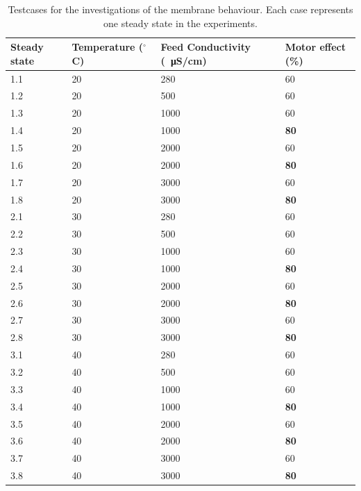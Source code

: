 \begin{table}[H]
\centering
\begin{tabular}{|p{1.4cm}||p{2cm}|p{3.2cm}|p{1.8cm}|}
 \hline
 \textbf{Steady state }&Temperature  ($^{\circ}$C)&Feed Conductivity (\SI{}{\micro\siemens}/cm)&Motor effect (\%) \\
 \hline
 1.1 & 20 & 280  & 60 \\
 1.2 & 20 & 500  & 60 \\
 1.3 & 20 & 1000 & 60  \\
 1.4 & 20 & 1000 & \textbf{80} \\
 1.5 & 20 & 2000 & 60 \\
 1.6 & 20 & 2000 & \textbf{80}\\
 1.7 & 20 & 3000 & 60 \\
 1.8 & 20 & 3000 & \textbf{80}\\
 \hline
 2.1 & 30 & 280 & 60 \\
 2.2 & 30 & 500 & 60 \\
 2.3 & 30 & 1000 & 60 \\
 2.4 & 30 & 1000 & \textbf{80}\\
 2.5 & 30 & 2000 & 60 \\
 2.6 & 30 & 2000 & \textbf{80}\\
 2.7 & 30 & 3000 & 60 \\
 2.8 & 30 & 3000 & \textbf{80}\\
 \hline 
 3.1 & 40 & 280 & 60 \\
 3.2 & 40 & 500 & 60 \\
 3.3 & 40 & 1000 & 60 \\
 3.4 & 40 & 1000 & \textbf{80}\\
 3.5 & 40 & 2000 & 60 \\
 3.6 & 40 & 2000 & \textbf{80}\\
 3.7 & 40 & 3000 & 60 \\
 3.8 & 40 & 3000 & \textbf{80}\\
\hline
\end{tabular}
\caption{Testcases for the investigations of the membrane behaviour. Each case represents one steady state in the experiments.}
    \label{tab:testcases} 
\end{table}














